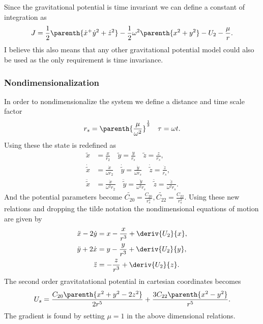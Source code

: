 Since the gravitational potential is time invariant we can define a constant of integration as
\begin{align*}
	J = \frac{1}{2} \parenth{\dot{x}^ + \dot{y}^2 + \dot{z}^2} - \frac{1}{2} \omega^2 \parenth{x^2 + y^2} - U_2 - \frac{\mu}{r} .
\end{align*}
I believe this also means that any other gravitational potential model could also be used as the only requirement is time invariance.

\subsubsection*{Nondimensionalization}
In order to nondimensionalize the system we define a distance and time scale factor
\begin{align*}
	r_s = \parenth{\frac{\mu}{\omega^2}}^{\frac{1}{3}} \quad \tau = \omega t .	
\end{align*}
Using these the state is redefined as
\begin{align*}
	\tilde{x} &= \frac{x}{r_2} \quad \tilde{y} = \frac{y}{r_s} \quad \tilde{z} = \frac{z}{r_s}, \\
	\dot{\tilde{x}} &= \frac{\dot{x}}{\omega r_2} \quad \dot{\tilde{y}} = \frac{\dot{y}}{\omega r_s} \quad \dot{\tilde{z}} = \frac{\dot{z}}{r_s},\\
	\ddot{\tilde{x}} &= \frac{\ddot{x}}{\omega^2 r_2} \quad \ddot{\tilde{y}} = \frac{\ddot{y}}{\omega^2 r_s} \quad \ddot{\tilde{z}} = \frac{\ddot{z}}{\omega^2 r_s} .
\end{align*}
And the potential parameters become \( \tilde{C_{20}} = \frac{C_{20}}{r_s^2}, \tilde{C_{22}} = \frac{C_{22}}{r_s^2} \).
Using these new relations and dropping the tilde notation the nondimensional equations of motion are given by
\begin{align*}
	\ddot{x} - 2 \dot{y} &= x - \frac{x}{r^3} + \deriv{U_2}{x}, \\
	\ddot{y} + 2 \dot{x} &=  y - \frac{y}{r^3} + \deriv{U_2}{y}, \\
	\ddot{z} &= -\frac{z}{r^3} + \deriv{U_2}{z} .
\end{align*}
The second order gravitatational potential in cartesian coordinates becomes
\begin{align*}
	U_s = \frac{C_{20} \parenth{x^2+y^2-2z^2}}{2 r^5} + \frac{3 C_{22} \parenth{x^2 - y^2}}{r^5} .
\end{align*}
The gradient is found by setting \( \mu =1 \) in the above dimensional relations.

